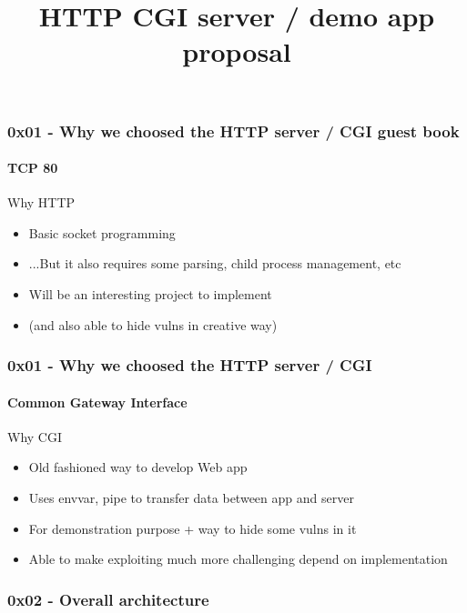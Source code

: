 \documentclass {beamer}
\title {HTTP CGI server / demo app proposal}
\begin{document}
\begin{frame}
  \titlepage
\end{frame}

\begin{frame}
  \frametitle{0x01 - Why we choosed the HTTP server / CGI guest book}
  \framesubtitle{TCP 80}

  Why HTTP

  \begin{itemize}
    \item<1-> Basic socket programming
    \item<2-> ...But it also requires some parsing, child process management, etc
    \item<3-> Will be an interesting project to implement
    \item<3-> (and also able to hide vulns in creative way)
  \end{itemize}
\end{frame}

\begin{frame}
  \frametitle{0x01 - Why we choosed the HTTP server / CGI}
  \framesubtitle{Common Gateway Interface}

  Why CGI

  \begin{itemize}
    \item<1-> Old fashioned way to develop Web app
    \item<2-> Uses envvar, pipe to transfer data between app and server
    \item<3-> For demonstration purpose + way to hide some vulns in it
    \item<4-> Able to make exploiting much more challenging depend on implementation
  \end{itemize}
\end{frame}

\begin{frame}
  \frametitle{0x02 - Overall architecture}
  \framesubtitle{}

  \centering
\end{frame}
\end{document}
